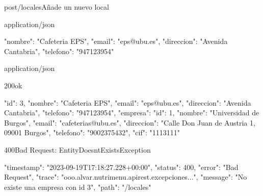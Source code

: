 \begin{apiRoute}{post}{/locales}{Añade un nuevo local}
	\begin{routeParameter}
	\end{routeParameter}
	\begin{routeRequest}{application/json}
		\begin{routeRequestBody}
{
	"nombre": "Cafeteria EPS",
	"email": "eps@ubu.es",
	"direccion": "Avenida Cantabria",
	"telefono": "947123954"
}
		\end{routeRequestBody}
	\end{routeRequest}
	\begin{routeResponse}{application/json}
		\begin{routeResponseItem}{200}{ok}
			\begin{routeResponseItemBody}
{
    "id": 3,
    "nombre": "Cafeteria EPS",
    "email": "eps@ubu.es",
    "direccion": "Avenida Cantabria",
    "telefono": "947123954",
    "empresa": {
        "id": 1,
        "nombre": "Universidad de Burgos",
        "email": "cafeterias@ubu.es",
        "direccion": "Calle Don Juan de Austria 1, 09001 Burgos",
        "telefono": "9002375432",
        "cif": "1113111"
    }
}
			\end{routeResponseItemBody}
		\end{routeResponseItem}
		\begin{routeResponseItem}{400}{Bad Request: EntityDoesntExistsException}
			\begin{routeResponseItemBody}
{
    "timestamp": "2023-09-19T17:18:27.228+00:00",
    "status": 400,
    "error": "Bad Request",
    "trace": "ooo.alvar.nutrimenu.apirest.excepciones...",
    "message": "No existe una empresa con id 3",
    "path": "/locales"
}
			\end{routeResponseItemBody}
		\end{routeResponseItem}
	\end{routeResponse}
\end{apiRoute}

